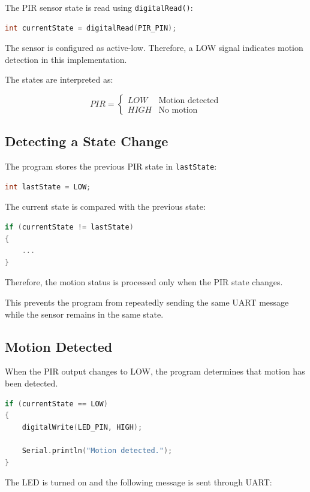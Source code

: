 \documentclass[12pt,a4paper]{article}
\begin{document}
The PIR sensor state is read using \texttt{digitalRead()}:

\begin{lstlisting}[language=C]
int currentState = digitalRead(PIR_PIN);
\end{lstlisting}

The sensor is configured as active-low. Therefore, a LOW signal
indicates motion detection in this implementation.

The states are interpreted as:

\[
PIR =
\begin{cases}
LOW & \text{Motion detected}\\
HIGH & \text{No motion}
\end{cases}
\]

\subsection{Detecting a State Change}

The program stores the previous PIR state in
\texttt{lastState}:

\begin{lstlisting}[language=C]
int lastState = LOW;
\end{lstlisting}

The current state is compared with the previous state:

\begin{lstlisting}[language=C]
if (currentState != lastState)
{
    ...
}
\end{lstlisting}

Therefore, the motion status is processed only when the PIR state
changes.

This prevents the program from repeatedly sending the same UART
message while the sensor remains in the same state.

\subsection{Motion Detected}

When the PIR output changes to LOW, the program determines that motion
has been detected.

\begin{lstlisting}[language=C]
if (currentState == LOW)
{
    digitalWrite(LED_PIN, HIGH);

    Serial.println("Motion detected.");
}
\end{lstlisting}

The LED is turned on and the following message is sent through UART:
\end{document}
